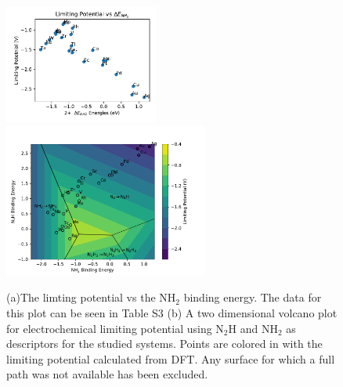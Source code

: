 \begin{figure}

    \centering
    \includegraphics[width=0.45\textwidth]{Images/NH2_v_limiting_pot.pdf}
    \includegraphics[width=0.6\textwidth]{Images/2d_scaling_plot.pdf}
    \caption{(a)The limting potential vs the NH$_2$ binding energy. The data for this plot can be seen in Table S3 (b) A two dimensional volcano plot for electrochemical limiting potential using N$_2$H and NH$_2$ as descriptors for the studied systems. Points are colored in with the limiting potential calculated from DFT. Any surface for which a full path was not available has been excluded.}
    \label{fig:2d_plot}
\end{figure}




